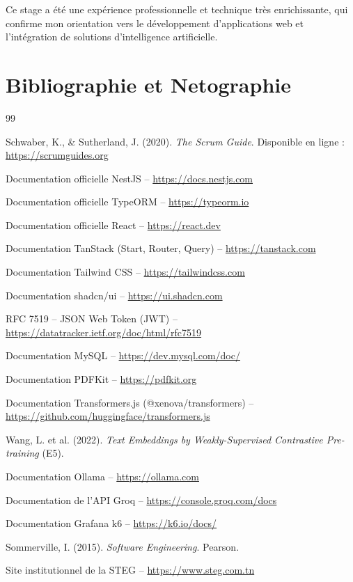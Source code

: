 \documentclass[12pt,a4paper,oneside,openany]{report}
\begin{document}
Ce stage a été une expérience professionnelle et technique très enrichissante, qui confirme mon orientation vers le développement d'applications web et l'intégration de solutions d'intelligence artificielle.

\clearpage

\section*{Bibliographie et Netographie}

\begingroup
\renewcommand{\chapter}[2]{}
\begin{thebibliography}{99}

 Schwaber, K., \& Sutherland, J. (2020). \textit{The Scrum Guide}. Disponible en ligne : \url{https://scrumguides.org}

 Documentation officielle NestJS -- \url{https://docs.nestjs.com}

 Documentation officielle TypeORM -- \url{https://typeorm.io}

 Documentation officielle React -- \url{https://react.dev}

 Documentation TanStack (Start, Router, Query) -- \url{https://tanstack.com}

 Documentation Tailwind CSS -- \url{https://tailwindcss.com}

 Documentation shadcn/ui -- \url{https://ui.shadcn.com}

 RFC 7519 -- JSON Web Token (JWT) -- \url{https://datatracker.ietf.org/doc/html/rfc7519}

 Documentation MySQL -- \url{https://dev.mysql.com/doc/}

 Documentation PDFKit -- \url{https://pdfkit.org}

 Documentation Transformers.js (@xenova/transformers) -- \url{https://github.com/huggingface/transformers.js}

 Wang, L. et al. (2022). \textit{Text Embeddings by Weakly-Supervised Contrastive Pre-training} (E5).

 Documentation Ollama -- \url{https://ollama.com}

 Documentation de l'API Groq -- \url{https://console.groq.com/docs}

 Documentation Grafana k6 -- \url{https://k6.io/docs/}

 Sommerville, I. (2015). \textit{Software Engineering}. Pearson.

 Site institutionnel de la STEG -- \url{https://www.steg.com.tn}

\end{thebibliography}
\endgroup
\end{document}

